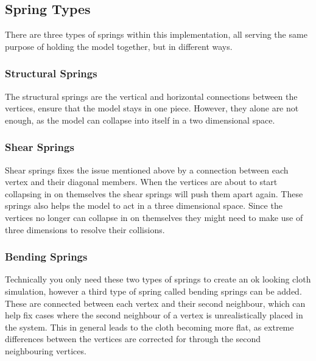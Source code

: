 \begin{figure}
    \caption{}
    \label{fig:my_cloth_implementation_springs}
\end{figure}


\subsection{Spring Types}
There are three types of springs within this implementation, all serving the same purpose of holding the model together,
but in different ways.

\subsubsection{Structural Springs}
The structural springs are the vertical and horizontal connections between the vertices,
ensure that the model stays in one piece.
However, they alone are not enough, as the model can collapse into itself in a two dimensional space.

\subsubsection{Shear Springs}
Shear springs fixes the issue mentioned above by a connection between each vertex and their diagonal members.
When the vertices are about to start collapsing in on themselves the shear springs will push them apart again.
These springs also helps the model to act in a three dimensional space.
Since the vertices no longer can collapse in on themselves they might need to make use of three dimensions to
resolve their collisions.

\subsubsection{Bending Springs}
Technically you only need these two types of springs to create an ok looking cloth simulation,
however a third type of spring called bending springs can be added.
These are connected between each vertex and their second neighbour,
which can help fix cases where the second neighbour of a vertex is unrealistically placed in the system.
This in general leads to the cloth becoming more flat, as extreme differences between the vertices are corrected for
through the second neighbouring vertices.

